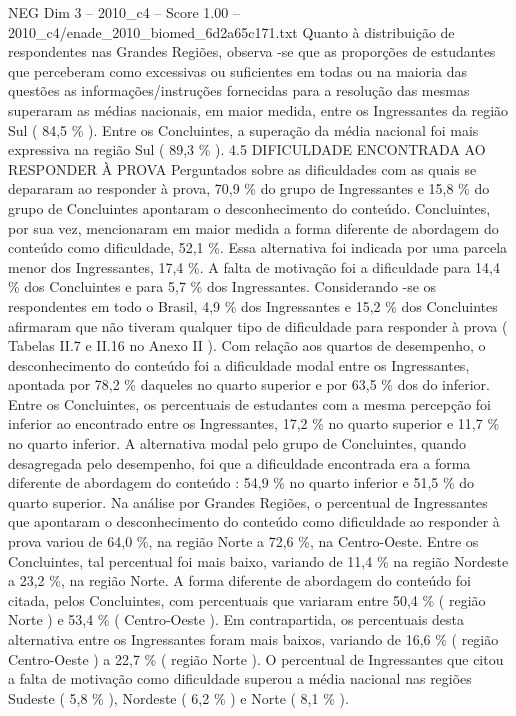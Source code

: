 \begin{textsample}{NEG Dim 3 – 2010\_c4 – Score 1.00 – 2010\_c4/enade\_2010\_biomed\_6d2a65c171.txt}
Quanto à distribuição de respondentes nas Grandes Regiões, observa -se que as proporções de estudantes que perceberam como excessivas ou suficientes em todas ou na maioria das questões as informações/instruções fornecidas para a resolução das mesmas superaram as médias nacionais, em maior medida, entre os Ingressantes da região Sul ( 84,5 \% ).
Entre os Concluintes, a superação da média nacional foi mais expressiva na região Sul ( 89,3 \% ). 4.5 DIFICULDADE ENCONTRADA AO RESPONDER À PROVA Perguntados sobre as dificuldades com as quais se depararam ao responder à prova, 70,9 \% do grupo de Ingressantes e 15,8 \% do grupo de Concluintes apontaram o desconhecimento do conteúdo.
Concluintes, por sua vez, mencionaram em maior medida a forma diferente de abordagem do conteúdo como dificuldade, 52,1 \%.
Essa alternativa foi indicada por uma parcela menor dos Ingressantes, 17,4 \%.
A falta de motivação foi a dificuldade para 14,4 \% dos Concluintes e para 5,7 \% dos Ingressantes.
Considerando -se os respondentes em todo o Brasil, 4,9 \% dos Ingressantes e 15,2 \% dos Concluintes afirmaram que não tiveram qualquer tipo de dificuldade para responder à prova ( Tabelas II.7 e II.16 no Anexo II ).
Com relação aos quartos de desempenho, o desconhecimento do conteúdo foi a dificuldade modal entre os Ingressantes, apontada por 78,2 \% daqueles no quarto superior e por 63,5 \% dos do inferior.
Entre os Concluintes, os percentuais de estudantes com a mesma percepção foi inferior ao encontrado entre os Ingressantes, 17,2 \% no quarto superior e 11,7 \% no quarto inferior.
A alternativa modal pelo grupo de Concluintes, quando desagregada pelo desempenho, foi que a dificuldade encontrada era a forma diferente de abordagem do conteúdo : 54,9 \% no quarto inferior e 51,5 \% do quarto superior.
Na análise por Grandes Regiões, o percentual de Ingressantes que apontaram o desconhecimento do conteúdo como dificuldade ao responder à prova variou de 64,0 \%, na região Norte a 72,6 \%, na Centro-Oeste.
Entre os Concluintes, tal percentual foi mais baixo, variando de 11,4 \% na região Nordeste a 23,2 \%, na região Norte.
A forma diferente de abordagem do conteúdo foi citada, pelos Concluintes, com percentuais que variaram entre 50,4 \% ( região Norte ) e 53,4 \% ( Centro-Oeste ).
Em contrapartida, os percentuais desta alternativa entre os Ingressantes foram mais baixos, variando de 16,6 \% ( região Centro-Oeste ) a 22,7 \% ( região Norte ).
O percentual de Ingressantes que citou a falta de motivação como dificuldade superou a média nacional nas regiões Sudeste ( 5,8 \% ), Nordeste ( 6,2 \% ) e Norte ( 8,1 \% ).

\end{textsample}
